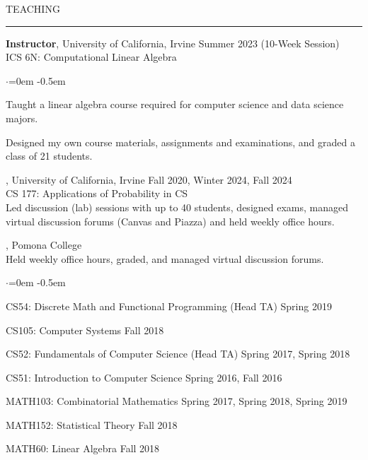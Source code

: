 \documentclass{resume} %
\renewenvironment{rSection}[1]{
\sectionskip
\textcolor{CarnegieMellonRed}{\MakeUppercase{#1}}
\sectionlineskip
\hrule
\begin{list}{}{
\setlength{\leftmargin}{1.5em}
}
\item[]
}{
\end{list}
}
\begin{document}
\begin{rSection}{Teaching}

{\bf Instructor}, University of California, Irvine \hfill { Summer 2023 (10-Week Session)}\\
ICS 6N: Computational Linear Algebra
\begin{list}{$\cdot$}{\leftmargin=0em} 
    \itemsep -0.5em \vspace{-0.5em}
      \item Taught a linear algebra course required for computer science and data science majors.
      \item Designed my own course materials, assignments and examinations, and graded a class of 21 students.
  \end{list}
  \vspace{1.em}

 , University of California, Irvine \hfill { Fall 2020, Winter 2024, Fall 2024}\\
 CS 177: Applications of Probability in CS\\
  Led discussion (lab) sessions with up to 40 students, designed exams, managed virtual discussion forums (Canvas and Piazza) and held weekly office hours.
  \vspace{1.em}

 , Pomona College\\
Held weekly office hours, graded, and managed virtual discussion forums.
\begin{list}{$\cdot$}{\leftmargin=0em}
    \itemsep -0.5em \vspace{-0.5em}
      \item CS54: Discrete Math and Functional Programming (Head TA) \hfill { Spring 2019}
      \item CS105: Computer Systems \hfill { Fall 2018}
      \item CS52: Fundamentals of Computer Science (Head TA) \hfill { Spring 2017, Spring 2018}
      \item CS51: Introduction to Computer Science \hfill { Spring 2016, Fall 2016}
      \item MATH103: Combinatorial Mathematics \hfill { Spring 2017, Spring 2018, Spring 2019}
      \item MATH152: Statistical Theory \hfill { Fall 2018}
      \item MATH60: Linear Algebra \hfill { Fall 2018}
  \end{list}
\end{rSection}
\end{document}
